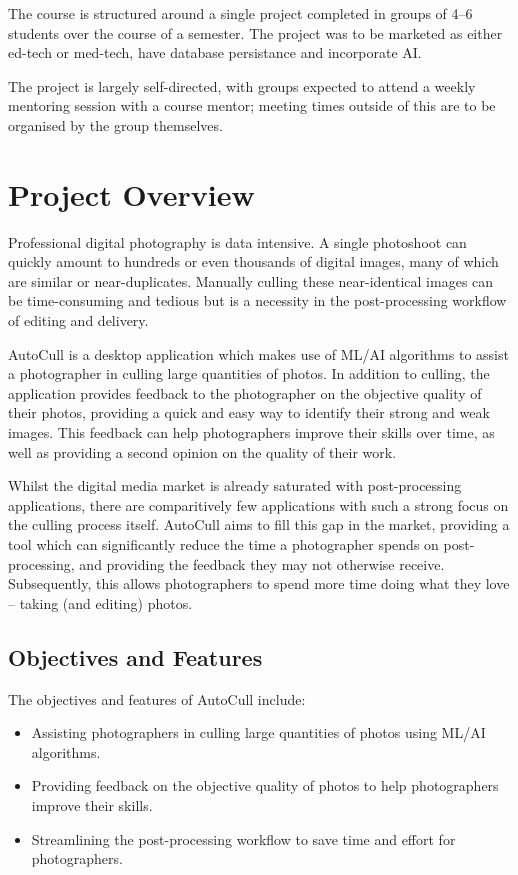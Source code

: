 \documentclass[conference]{IEEEtran}
\begin{document}
The course is structured around a single project completed in groups of 4–6 students over the course of a semester. The project was to be marketed as either ed-tech or med-tech, have database persistance and incorporate AI.

The project is largely self-directed, with groups expected to attend a weekly mentoring session with a course mentor; meeting times outside of this are to be organised by the group themselves.


\section{Project Overview}
Professional digital photography is data intensive. A single photoshoot can quickly amount to hundreds or even thousands of digital images, many of which are similar or near-duplicates. Manually culling these near-identical images can be time-consuming and tedious but is a necessity in the post-processing workflow of editing and delivery. 

AutoCull is a desktop application which makes use of ML/AI algorithms to assist a photographer in culling large quantities of photos. In addition to culling, the application provides feedback to the photographer on the objective quality of their photos, providing a quick and easy way to identify their strong and weak images. This feedback can help photographers improve their skills over time, as well as providing a second opinion on the quality of their work.

Whilst the digital media market is already saturated with post-processing applications, there are comparitively few applications with such a strong focus on the culling process itself. AutoCull aims to fill this gap in the market, providing a tool which can significantly reduce the time a photographer spends on post-processing, and providing the feedback they may not otherwise receive. Subsequently, this allows photographers to spend more time doing what they love – taking (and editing) photos.

\subsection{Objectives and Features}
The objectives and features of AutoCull include:

\begin{itemize}
    \item Assisting photographers in culling large quantities of photos using ML/AI algorithms.
    \item Providing feedback on the objective quality of photos to help photographers improve their skills.
    \item Streamlining the post-processing workflow to save time and effort for photographers.
\end{itemize}
\end{document}

